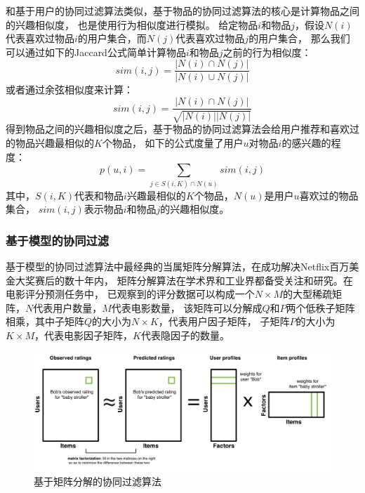 和基于用户的协同过滤算法类似，基于物品的协同过滤算法的核心是计算物品之间的兴趣相似度，
也是使用行为相似度进行模拟。
给定物品$i$和物品$j$，假设$N(i)$代表喜欢过物品$i$的用户集合，而$N(j)$代表喜欢过物品$j$的用户集合，
那么我们可以通过如下的Jaccard公式简单计算物品$i$和物品$j$之前的行为相似度：
\begin{equation}
sim(i, j) = \frac{ |N(i) \cap N(j)| } { |N(i) \cup N(j)| }
\end{equation}
或者通过余弦相似度来计算：
\begin{equation}
sim(i, j) = \frac{ |N(i) \cap N(j)| } { \sqrt{ |N(i)| |N(j)| } }
\end{equation}
得到物品之间的兴趣相似度之后，基于物品的协同过滤算法会给用户推荐和喜欢过的物品兴趣最相似的$K$个物品，
如下的公式度量了用户$u$对物品$i$的感兴趣的程度：
\begin{equation}
p(u, i) = \sum_{j \in S(i, K) \cap N(u) }{ sim(i, j) }
\end{equation}
其中，$S(i, K)$代表和物品$i$兴趣最相似的$K$个物品，$N(u)$是用户$u$喜欢过的物品集合，
$sim(i, j)$表示物品$i$和物品$j$的兴趣相似度。

\subsubsection{基于模型的协同过滤}
基于模型的协同过滤算法中最经典的当属矩阵分解算法，在成功解决Netflix百万美金大奖赛后的数十年内，
矩阵分解算法在学术界和工业界都备受关注和研究。在电影评分预测任务中，
已观察到的评分数据可以构成一个$N \times M$的大型稀疏矩阵，$N$代表用户数量，$M$代表电影数量，
该矩阵可以分解成$Q$和$P$两个低秩子矩阵相乘，其中子矩阵$Q$的大小为$N \times K$，代表用户因子矩阵，
子矩阵$P$的大小为$K \times M$，代表电影因子矩阵，$K$代表隐因子的数量。

\begin{figure}[htbp]
\centering
\includegraphics[scale=0.6]{images/mf.png}
\caption{基于矩阵分解的协同过滤算法}
\label{fig:mf}
\end{figure}

